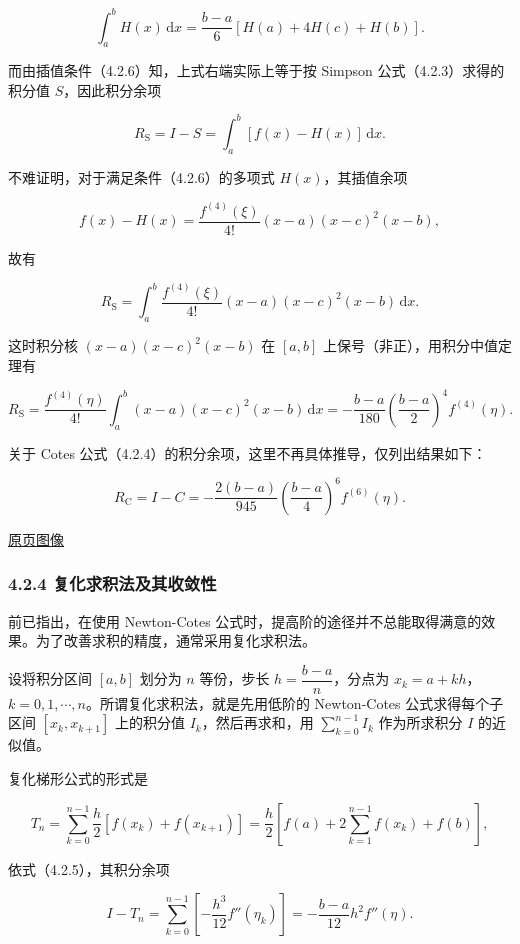 \documentclass[
  10pt,
  fontset=fandol]{ctexart}
\begin{document}
\[
\int_a^b H(x)\,\mathrm{d}x=\frac{b-a}{6}[H(a)+4H(c)+H(b)].
\]

而由插值条件（4.2.6）知，上式右端实际上等于按 Simpson 公式（4.2.3）求得的积分值 \(S\)，因此积分余项

\[
R_{\mathrm{S}}=I-S=\int_a^b[f(x)-H(x)]\,\mathrm{d}x.
\]

不难证明，对于满足条件（4.2.6）的多项式 \(H(x)\)，其插值余项

\[
f(x)-H(x)=\frac{f^{(4)}(\xi)}{4!}(x-a)(x-c)^2(x-b),
\]

故有

\[
R_{\mathrm{S}}=\int_a^b\frac{f^{(4)}(\xi)}{4!}(x-a)(x-c)^2(x-b)\,\mathrm{d}x.
\]

这时积分核 \((x-a)(x-c)^2(x-b)\) 在 \([a,b]\) 上保号（非正），用积分中值定理有

\[
R_{\mathrm{S}}=\frac{f^{(4)}(\eta)}{4!}\int_a^b(x-a)(x-c)^2(x-b)\,\mathrm{d}x
=-\frac{b-a}{180}\left(\frac{b-a}{2}\right)^4f^{(4)}(\eta).
\tag{4.2.7}
\]

关于 Cotes 公式（4.2.4）的积分余项，这里不再具体推导，仅列出结果如下：

\[
R_{\mathrm{C}}=I-C=-\frac{2(b-a)}{945}\left(\frac{b-a}{4}\right)^6f^{(6)}(\eta).
\tag{4.2.8}
\]

\href{../../source-images/pdf-099.jpeg}{原页图像}

\subsubsection{4.2.4 复化求积法及其收敛性}\label{ux590dux5316ux6c42ux79efux6cd5ux53caux5176ux6536ux655bux6027}

前已指出，在使用 Newton-Cotes 公式时，提高阶的途径并不总能取得满意的效果。为了改善求积的精度，通常采用复化求积法。

设将积分区间 \([a,b]\) 划分为 \(n\) 等份，步长 \(h=\dfrac{b-a}{n}\)，分点为 \(x_k=a+kh\)，\(k=0,1,\cdots,n\)。所谓复化求积法，就是先用低阶的 Newton-Cotes 公式求得每个子区间 \([x_k,x_{k+1}]\) 上的积分值 \(I_k\)，然后再求和，用 \(\displaystyle\sum_{k=0}^{n-1}I_k\) 作为所求积分 \(I\) 的近似值。

复化梯形公式的形式是

\[
T_n=\sum_{k=0}^{n-1}\frac h2[f(x_k)+f(x_{k+1})]
=\frac h2\left[f(a)+2\sum_{k=1}^{n-1}f(x_k)+f(b)\right],
\tag{4.2.9}
\]

依式（4.2.5），其积分余项

\[
I-T_n=\sum_{k=0}^{n-1}\left[-\frac{h^3}{12}f''(\eta_k)\right]
=-\frac{b-a}{12}h^2f''(\eta).
\tag{4.2.10}
\]
\end{document}

